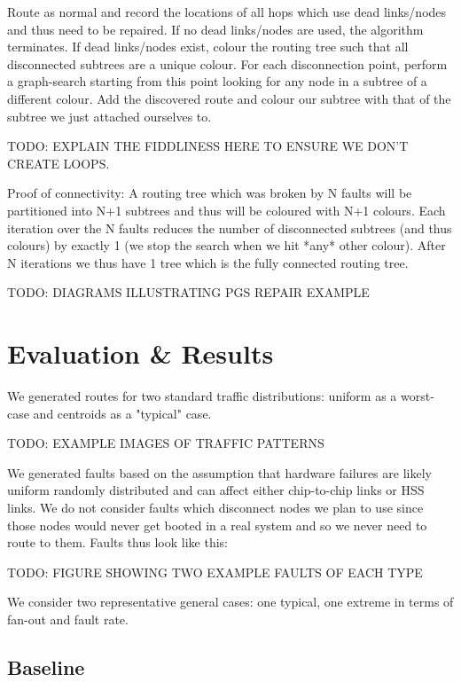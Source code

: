			Route as normal and record the locations of all hops which use dead
			links/nodes and thus need to be repaired. If no dead links/nodes are
			used, the algorithm terminates. If dead links/nodes exist, colour the
			routing tree such that all disconnected subtrees are a unique colour. For
			each disconnection point, perform a graph-search starting from this point
			looking for any node in a subtree of a different colour. Add the
			discovered route and colour our subtree with that of the subtree we just
			attached ourselves to.
			
			TODO: EXPLAIN THE FIDDLINESS HERE TO ENSURE WE DON'T CREATE LOOPS. 
			
			Proof of connectivity: A routing tree which was broken by N faults will
			be partitioned into N+1 subtrees and thus will be coloured with N+1
			colours. Each iteration over the N faults reduces the number of
			disconnected subtrees (and thus colours) by exactly 1 (we stop the search
			when we hit *any* other colour). After N iterations we thus have 1 tree
			which is the fully connected routing tree.
			
			TODO: DIAGRAMS ILLUSTRATING PGS REPAIR EXAMPLE
		
	\section{Evaluation \& Results}
		
		We generated routes for two standard traffic distributions: uniform as a
		worst-case and centroids as a "typical" case.
		
		TODO: EXAMPLE IMAGES OF TRAFFIC PATTERNS
		
		We generated faults based on the assumption that hardware failures are
		likely uniform randomly distributed and can affect either chip-to-chip
		links or HSS links. We do not consider faults which disconnect nodes we
		plan to use since those nodes would never get booted in a real system and
		so we never need to route to them. Faults thus look like this:
		
		TODO: FIGURE SHOWING TWO EXAMPLE FAULTS OF EACH TYPE
		
		We consider two representative general cases: one typical, one extreme in
		terms of fan-out and fault rate.
		
		\subsection{Baseline}
		
